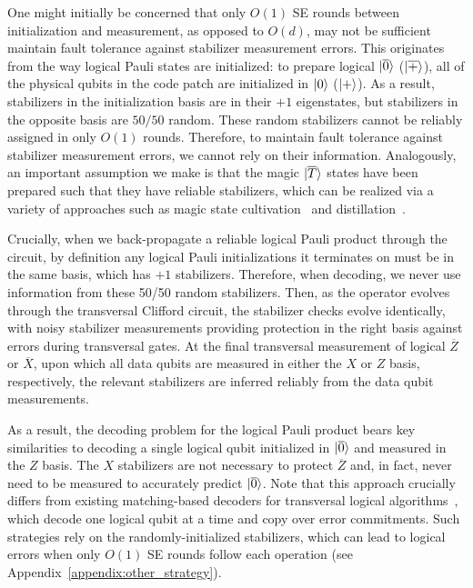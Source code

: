 \documentclass[prx,twocolumn,secnumarabic,balancelastpage,amsmath,amssymb,longbibliography]{revtex4-2}
\newcommand{\lop}[1]{\overline{#1}}
\newcommand{\lket}[1]{\ket{\overline{#1}}}
\begin{document}
One might initially be concerned that only $O(1)$ SE rounds between initialization and measurement, as opposed to $O(d)$, may not be sufficient maintain fault tolerance against stabilizer measurement errors. 
%
This originates from the way logical Pauli states are initialized: to prepare logical $\lket{0}$ ($\lket{+}$), all of the physical qubits in the code patch are initialized in $\ket{0}$ ($\ket{+}$). 
%
As a result, stabilizers in the initialization basis are in their $+1$ eigenstates, but stabilizers in the opposite basis are $50/50$ random.
%
These random stabilizers cannot be reliably assigned in only $O(1)$ rounds. 
%
Therefore, to maintain fault tolerance against stabilizer measurement errors, we cannot rely on their information.
%
Analogously, an important assumption we make is that the magic $\ket{\lop{T}}$ states have been  prepared such that they have reliable stabilizers, which can be realized via a variety of approaches such as magic state cultivation~\cite{gidney2024magic} and distillation~\cite{bravyi2005universal}.

Crucially, when we back-propagate a reliable logical Pauli product through the circuit, by definition any logical Pauli initializations it terminates on must be in the same basis, which has $+1$ stabilizers.
%
Therefore, when decoding, we never use information from these 50/50 random stabilizers. 
%
Then, as the operator evolves through the transversal Clifford circuit, the stabilizer checks evolve identically, with noisy stabilizer measurements providing protection in the right basis against errors during transversal gates.
%
At the final transversal measurement of logical $\lop{Z}$ or $\lop{X}$, upon which all data qubits are measured in either the $X$ or $Z$ basis, respectively, the relevant stabilizers are inferred reliably from the data qubit measurements.

As a result, the decoding problem for the logical Pauli product bears key similarities to decoding a single logical qubit initialized in $\lket{0}$ and measured in the $Z$ basis.  
%
The $X$ stabilizers are not necessary to protect $\lop{Z}$ and, in fact, never need to be measured to accurately predict $\lket{0}$. 
%
Note that this approach crucially differs from existing matching-based decoders for transversal logical algorithms~\cite{beverland2021cost,sahay2024error,wan2024iterative}, which decode one logical qubit at a time and copy over error commitments.
%
Such strategies rely on the randomly-initialized stabilizers, which can lead to logical errors when only $O(1)$ SE rounds follow each operation (see Appendix~\ref{appendix:other_strategy}).
\end{document}
